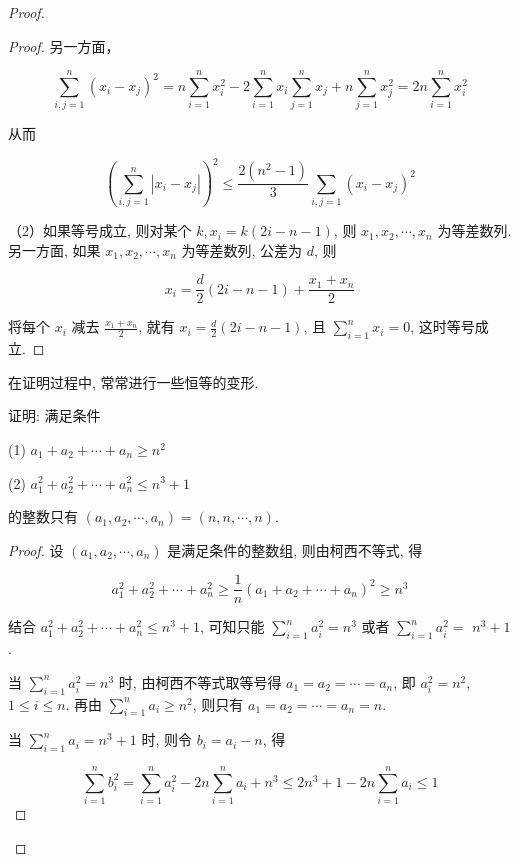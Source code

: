 \begin{proof}
\begin{proof}
	另一方面，
	
	$$
	\sum_{i, j=1}^{n}\left(x_{i}-x_{j}\right)^{2}=n \sum_{i=1}^{n} x_{i}^{2}-2 \sum_{i=1}^{n} x_{i} \sum_{j=1}^{n} x_{j}+n \sum_{j=1}^{n} x_{j}^{2}=2 n \sum_{i=1}^{n} x_{i}^{2}
	$$
	
	从而
	
	$$
	\left(\sum_{i, j=1}^{n}\left|x_{i}-x_{j}\right|\right)^{2} \leqslant \frac{2\left(n^{2}-1\right)}{3} \sum_{i, j=1}\left(x_{i}-x_{j}\right)^{2}
	$$
	
	（2）如果等号成立, 则对某个 $k, x_{i}=k(2 i-n-1)$, 则 $x_{1}, x_{2}, \cdots, x_{n}$ 为等差数列. 另一方面, 如果 $x_{1}, x_{2}, \cdots, x_{n}$ 为等差数列, 公差为 $d$, 则
	
	$$
	x_{i}=\frac{d}{2}(2 i-n-1)+\frac{x_{1}+x_{n}}{2}
	$$
	
	将每个 $x_{i}$ 减去 $\frac{x_{1}+x_{n}}{2}$, 就有 $x_{i}=\frac{d}{2}(2 i-n-1)$, 且 $\sum_{i=1}^{n} x_{i}=0$, 这时等号成立.
\end{proof}
\begin{note}
	在证明过程中, 常常进行一些恒等的变形.
\end{note}

\begin{example}
	证明: 满足条件
	
	(1) $a_{1}+a_{2}+\cdots+a_{n} \geqslant n^{2}$
	
	(2) $a_{1}^{2}+a_{2}^{2}+\cdots+a_{n}^{2} \leqslant n^{3}+1$
	
	的整数只有 $\left(a_{1}, a_{2}, \cdots, a_{n}\right)=(n, n, \cdots, n)$.
\end{example}
\begin{proof}
	设 $\left(a_{1}, a_{2}, \cdots, a_{n}\right)$ 是满足条件的整数组, 则由柯西不等式, 得
	
	$$
	a_{1}^{2}+a_{2}^{2}+\cdots+a_{n}^{2} \geqslant \frac{1}{n}\left(a_{1}+a_{2}+\cdots+a_{n}\right)^{2} \geqslant n^{3}
	$$
	
	结合 $a_{1}^{2}+a_{2}^{2}+\cdots+a_{n}^{2} \leqslant n^{3}+1$, 可知只能 $\sum_{i=1}^{n} a_{i}^{2}=n^{3}$ 或者 $\sum_{i=1}^{n} a_{i}^{2}=$ $n^{3}+1$.
	
	当 $\sum_{i=1}^{n} a_{i}^{2}=n^{3}$ 时, 由柯西不等式取等号得 $a_{1}=a_{2}=\cdots=a_{n}$, 即 $a_{i}^{2}=n^{2}$, $1 \leqslant i \leqslant n$. 再由 $\sum_{i=1}^{n} a_{i} \geqslant n^{2}$, 则只有 $a_{1}=a_{2}=\cdots=a_{n}=n$.
	
	当 $\sum_{i=1}^{n} a_{i}=n^{3}+1$ 时, 则令 $b_{i}=a_{i}-n$, 得
	
	$$
	\sum_{i=1}^{n} b_{i}^{2}=\sum_{i=1}^{n} a_{i}^{2}-2 n \sum_{i=1}^{n} a_{i}+n^{3} \leqslant 2 n^{3}+1-2 n \sum_{i=1}^{n} a_{i} \leqslant 1
	$$
	

\end{proof}
\end{proof}
